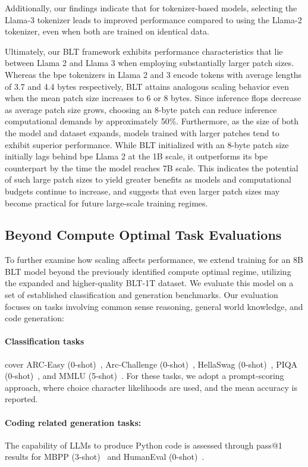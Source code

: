Additionally, our findings indicate that for tokenizer-based models, selecting the Llama-3 tokenizer leads to improved performance compared to using the Llama-2 tokenizer, even when both are trained on identical data.

Ultimately, our {\textsc BLT} framework exhibits performance characteristics that lie between Llama 2 and Llama 3 when employing substantially larger patch sizes. Whereas the bpe tokenizers in Llama 2 and 3 encode tokens with average lengths of 3.7 and 4.4 bytes respectively, {\textsc BLT} attains analogous scaling behavior even when the mean patch size increases to 6 or 8 bytes. Since inference flops decrease as average patch size grows, choosing an 8-byte patch can reduce inference computational demands by approximately 50\%. Furthermore, as the size of both the model and dataset expands, models trained with larger patches tend to exhibit superior performance. While {\textsc BLT} initialized with an 8-byte patch size initially lags behind bpe Llama 2 at the 1B scale, it outperforms its bpe counterpart by the time the model reaches 7B scale. This indicates the potential of such large patch sizes to yield greater benefits as models and computational budgets continue to increase, and suggests that even larger patch sizes may become practical for future large-scale training regimes.

\subsection{Beyond Compute Optimal Task Evaluations}
\label{section:evals}
To further examine how scaling affects performance, we extend training for an 8B {\textsc BLT} model beyond the previously identified compute optimal regime, utilizing the expanded and higher-quality {\textsc BLT}-1T dataset. We evaluate this model on a set of established classification and generation benchmarks. Our evaluation focuses on tasks involving common sense reasoning, general world knowledge, and code generation:
\paragraph{Classification tasks} cover ARC-Easy (0-shot)~\citep{Eval_ARC}, Arc-Challenge (0-shot)~\citep{Eval_ARC}, HellaSwag (0-shot)~\citep{Eval_hellaswag}, PIQA (0-shot)~\citep{Eval_piqa}, and MMLU (5-shot)~\citep{hendrycks2020measuring}. For these tasks, we adopt a prompt-scoring approach, where choice character likelihoods are used, and the mean accuracy is reported.
\paragraph{Coding related generation tasks:}  The capability of LLMs to produce Python code is assessed through pass@1 results for MBPP (3-shot)~\citep{Eval_MBPP} and HumanEval (0-shot)~\citep{Eval_HumanEval}.

